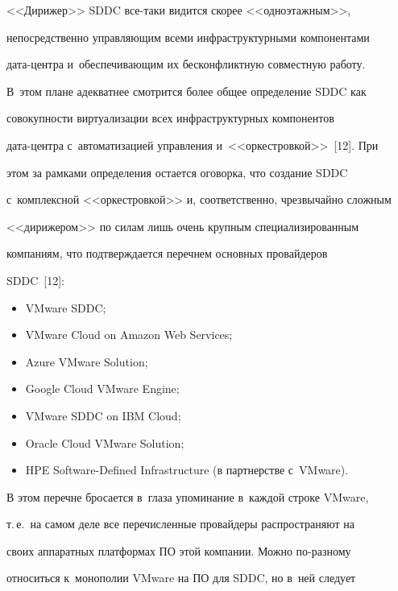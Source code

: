 <<Дирижер>> SDDC все-та\-ки видится скорее <<одноэтажным>>, 


непосредственно управ\-ля\-ющим всеми инфраструктурными компонентами 


дата-центра и~обеспечивающим их бесконфликтную со\-вмест\-ную работу. 


В~этом плане адекватнее смотрится более общее определение SDDC как 


совокупности виртуализации всех инфраструктурных компонентов  


да\-та-цент\-ра с~автоматизацией управ\-ле\-ния и~<<оркестровкой>>~[12]. При 


этом за рамками определения остается оговорка, что создание SDDC 


с~комплексной <<оркестровкой>> и, соответственно, чрезвычайно слож\-ным 


<<дирижером>> по силам лишь очень крупным специализированным 


компаниям, что под\-тверж\-да\-ет\-ся перечнем основных провайдеров 


SDDC~[12]:


    \begin{itemize}


\item VMware SDDC;


\item VMware Cloud on Amazon Web Services;


\item Azure VMware Solution;


\item Google Cloud VMware Engine;


\item VMware SDDC on IBM Cloud;


\item Oracle Cloud VMware Solution;


\item HPE Software-Defined Infrastructure (в партнерстве с~VMware).


\end{itemize}


%


    В этом перечне бросается в~глаза упоминание в~каждой строке VMware, 


т.\,е.\ на самом деле все перечисленные провайдеры распространяют на 


своих аппаратных платформах ПО этой компании. Мож\-но по-раз\-но\-му 


относиться к~монополии VMware на ПО для SDDC, но в~ней следует 


